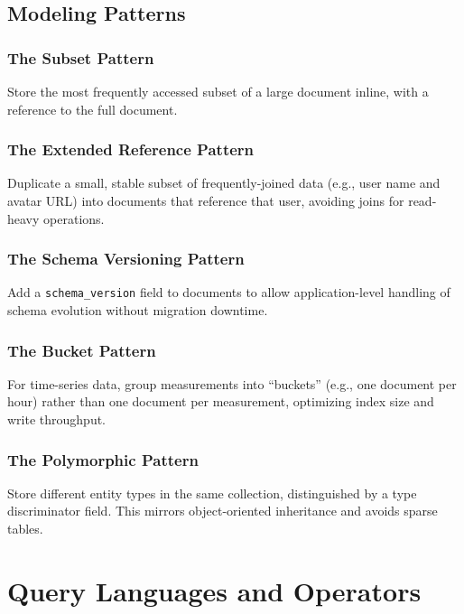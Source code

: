 \documentclass[12pt,a4paper]{article}
\begin{document}
\subsection{Modeling Patterns}

\subsubsection{The Subset Pattern}

Store the most frequently accessed subset of a large document inline, with a reference to the full document.

\subsubsection{The Extended Reference Pattern}

Duplicate a small, stable subset of frequently-joined data (e.g., user name and avatar URL) into documents that reference that user, avoiding joins for read-heavy operations.

\subsubsection{The Schema Versioning Pattern}

Add a \texttt{schema\_version} field to documents to allow application-level handling of schema evolution without migration downtime.

\subsubsection{The Bucket Pattern}

For time-series data, group measurements into ``buckets'' (e.g., one document per hour) rather than one document per measurement, optimizing index size and write throughput.

\subsubsection{The Polymorphic Pattern}

Store different entity types in the same collection, distinguished by a type discriminator field. This mirrors object-oriented inheritance and avoids sparse tables.

\section{Query Languages and Operators}
\end{document}
